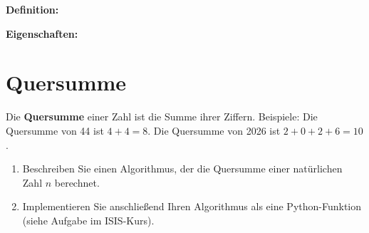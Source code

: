 \documentclass[ngerman,11pt]{article}
\begin{document}
\begin{tcolorbox}[colback=white, colframe=black, boxrule=0.3pt]
\textbf{Definition:}\par
\vspace{2cm}

\textbf{Eigenschaften:}
\vspace{4.5cm}
\end{tcolorbox}

\newpage
\section*{Quersumme}

Die \textbf{Quersumme} einer Zahl ist die Summe ihrer Ziffern. Beispiele: Die Quersumme von 44 ist $4+4 = 8$. Die Quersumme von 2026 ist $2+0+2+6 = 10$. 

\begin{enumerate}
\item Beschreiben Sie einen Algorithmus, der die Quersumme einer natürlichen Zahl $n$ berechnet. 

\begin{tcolorbox}[colback=white, colframe=black, boxrule=0.3pt, height=7cm]
\vspace*{\fill}
\end{tcolorbox}

\item Implementieren Sie anschließend Ihren Algorithmus als eine Python-Funktion (siehe Aufgabe im ISIS-Kurs).
\end{enumerate}
\end{document}
